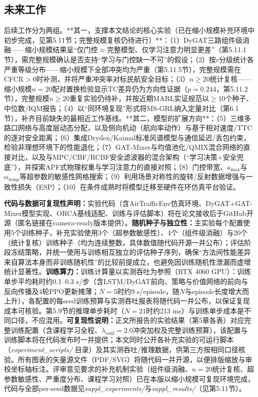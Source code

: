 \documentclass[12pt,a4paper,UTF8]{ctexart}
\begin{document}
\subsection{未来工作}

后续工作分为两组。**其一，支撑本文结论的核心实验（已在缩小规模补充环境中初步完成，见第5.11节；完整规模复核仍待进行）**：（1）DyGAT三路组件级消融——缩小规模结果呈“仅门控$\approx$完整模型、仅学习注意力明显更差”（第5.11.1节），需完整规模确认是否支持“学习与门控缺一不可”的假设；（2）按$r$分级统计各严重等级分布——缩小规模下全部冲突均为严重（第5.11.5节），完整规模需在CFCR$>0$时补测，并将严重冲突率对标民航安全目标；（3）$n\geq20$统计复核——缩小规模$n=20$配对置换检验显示TC差异仍为方向性证据（$p=0.244$，第5.11.2节），完整规模$n\geq20$重复实验仍待补，并按近期MARL实证规范\cite{ref59}以$\geq10$个种子、中位数/IQM报告；（4）以“同环境复现”形式将MS-GRL纳入定量对比（第6.1节），补齐目前缺失的最相近工作基线。**其二，模型的扩展方向**：（5）三维多路口网络与高度层动态分配，以及侧向机动（航向率动作）与基于相对速度/TTC的逐对安全距离；（6）集成Dryden/Kaimal标准风谱模型与通信延迟/丢包约束，检验非理想环境下的性能退化；（7）GAT-Mixer与均值池化/QMIX混合网络的直接对比，以及与MPC/CBF/RCBF安全滤波器的混合架构（“学习决策+安全兜底”），并探索APF式物理权重与学习注意力的直接对照；（8）门控带宽、$a_{\max}$与$\alpha_{\text{temp}}$等超参数的敏感性网格搜索；（9）利用场景对称性的旋转/反射数据增强与一致性损失（ESP\cite{ref57}）；（10）在条件成熟时将模型迁移至硬件在环仿真平台验证。

\textbf{代码与数据可复现性声明：}实验代码（含AirTrafficEnv仿真环境、DyGAT+GAT-Mixer模型实现、ORCA基线适配、训练与评估脚本）将在论文接收后于GitHub开源（匿名链接在camera-ready版本提供）。\textbf{随机种子与独立性：}主实验每个配置使用5个训练种子，补充实验使用3个（超参数敏感性）、4个（组件级消融）与20个（统计复核）训练种子（均为连续整数，具体数值随代码开源一并公布）；评估阶段冻结策略，并统一使用与训练相互独立的评估种子序列，确保“方法间性能差异来自算法本身而非训练随机性”的比较前提成立，也避免因训练随机性泄漏而虚增统计显著性。\textbf{训练算力：}训练计算量以实测吞吐为参照（RTX 4060 GPU）：训练单步平均耗时约0.1--0.3 s/步（含LSTM/DyGAT前向、策略与价值网络的前向与反向传播及4轮PPO更新摊薄；$N=5$时约9 s/episode，随$N$与episode长度增大而上升），各配置的每seed训练预算与实测吞吐报表将随代码一并公布，以保证复现成本可核验。第5.9节的推理单步耗时（$N=21$时约213 ms）与训练单步成本是不同口径，不应混用。\textbf{可复现性说明：}正文所报告的实验结果（第5章各表）对应完整训练配置（含课程学习全程、$\lambda_{\text{conf}}=2.0$冲突加权及完整训练预算），该配置与训练脚本将在代码发布时一并提供；本文同时公开各补充实验的可运行脚本（\textit{experiment\_scripts/} 目录）及其实测吞吐/推理数据，供第三方按相同口径核验。所有图表的矢量源文件（PDF/SVG）将随代码一并开源，以便排版缩放与审校坐标轴标注。评审意见要求的补充机制实验（组件级消融、$n=20$统计复核、超参数敏感性、严重度分布、课程学习对照）已在本版以缩小规模可复现环境完成，代码与全部per-seed数据见\textit{suppl\_experiments/}与\textit{suppl\_results/}（见第5.11节）。
\end{document}
